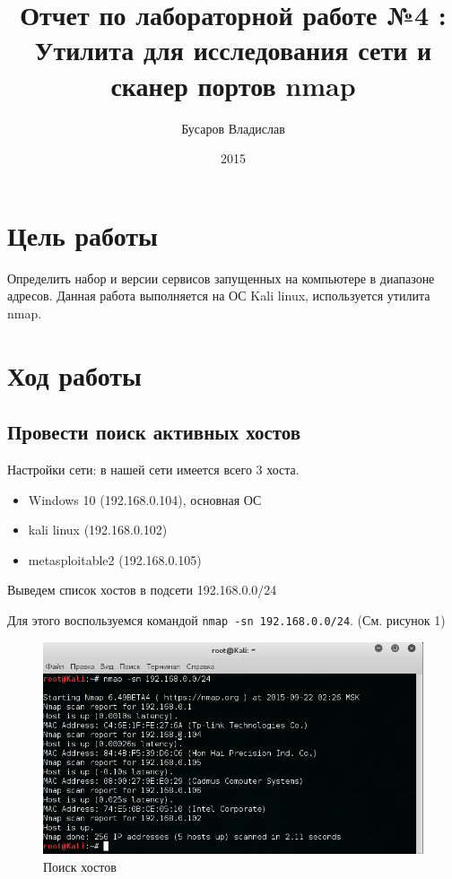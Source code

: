 \documentclass[11pt, a4paper]{article}		%
\author{Бусаров Владислав}
\title{Отчет по лабораторной работе №4 :\\ Утилита для исследования сети и сканер портов nmap}
\date{2015}
\begin{document}
\maketitle
\tableofcontents
\newpage



\section{Цель работы}

Определить набор и версии сервисов запущенных на компьютере в диапазоне адресов.
Данная работа выполняется на ОС Kali linux, используется утилита nmap.




\section{Ход работы}



\subsection{Провести поиск активных хостов}

Настройки сети: в нашей сети имеется всего 3 хоста.

\begin{itemize}
\item Windows 10 (192.168.0.104), основная ОС
\item kali linux (192.168.0.102)
\item metasploitable2 (192.168.0.105)
\end{itemize}

Выведем список хостов в подсети 192.168.0.0/24

Для этого воспользуемся командой \verb'nmap -sn 192.168.0.0/24'. (См. рисунок 1)

\begin{figure}[h!]
\centering
\includegraphics[scale=0.8]{res/1}
\caption{Поиск хостов}
\end{figure}
\end{document}
